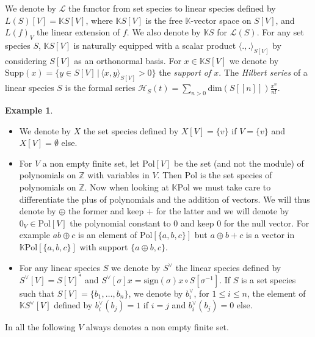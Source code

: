 \documentclass[a4paper]{article}
\theoremstyle{definition}
\newtheorem{example}[definition]{Example}
\newcommand{\K}{\mathbb{K}}
\begin{document}
We denote by $\mathcal{L}$ the functor from set species to linear species defined by
$L(S)[V] = \K S[V]$, where $\K S[V]$ is the free $\K$-vector space on $S[V]$,
and $L(f)_V$ the linear extension of $f$. We also denote by $\K S$ for $\mathcal{L}(S)$.
For any set species $S$, $\K S[V]$ is naturally equipped with a scalar product
$\langle ., .\rangle_{S[V]}$ by considering $S[V]$ as an orthonormal basis. For $x\in\K S[V]$
we denote by $\text{Supp}(x) = \{y\in S[V]\,|\, \langle x, y\rangle_{S[V]} > 0\}$ the
\textit{support of $x$}. The \textit{Hilbert series} of a linear species $S$ is
the formal series $\mathcal{H}_S(t) = \sum_{n>0} \text{dim}(S[[n]])\frac{x^n}{n!}$.

\begin{example}
\label{notpol}
\begin{itemize}
	\item We denote by $X$ the set species defined by $X[V] = \{v\}$ if $V=\{v\}$ and $X[V] = \emptyset$ else.
	\item For $V$ a non empty finite set, let $\text{Pol}[V]$ be the set (and not the module)
	of polynomials on $\mathbb{Z}$ with variables in $V$.
	Then $\text{Pol}$ is the set species of polynomials on $\mathbb{Z}$. Now when looking at $\K \text{Pol}$
	we must take care to differentiate the plus of polynomials and the addition of vectors.
	We will thus denote by $\oplus$ the former and keep $+$ for the latter and we will denote by
	$0_V\in\text{Pol}[V]$ the polynomial constant to 0 and keep $0$ for the null vector.
	For example $ab\oplus c$ is an element of $\text{Pol}[\{a,b,c\}]$ but $a\oplus b+c$
	is a vector in $\K \text{Pol}[\{a,b,c\}]$ with support $\{a\oplus b, c\}$.

	\item For any linear species $S$ we denote by $S^{\vee}$ the linear species defined by
	$S^{\vee}[V] = S[V]^*$ and $S^{\vee}[\sigma]x = \text{sign}(\sigma)x\circ S[\sigma^{-1}]$.
	If $S$ is a set species such that $S[V]=\{b_1,\dots,b_n\}$, we denote by $b_i^{\vee}$, 
	for $1\leq i\leq n$, the element of $\K S^{\vee}[V]$ defined by $b_i^{\vee}(b_j) = 1$ if
	$i=j$ and $b_i^{\vee}(b_j) = 0$ else.
\end{itemize}
\end{example}

In all the following $V$ always denotes a non empty finite set.
\end{document}
